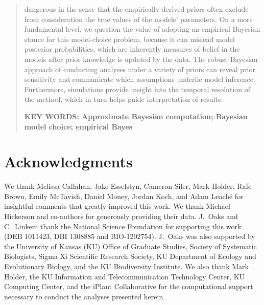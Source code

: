 \documentclass[letterpaper,12pt]{article}
\begin{document}
\begin{abstract}
    dangerous in the sense that the empirically-derived priors often
    exclude from consideration the true values of the models' parameters.
    On a more fundamental level, we question the value of adopting an empirical
    Bayesian stance for this model-choice problem, because it can mislead model
    posterior probabilities, which are inherently measures of belief in the
    models after prior knowledge is updated by the data.
    The robust Bayesian approach of conducting analyses under a variety
    of priors can reveal prior sensitivity and communicate which assumptions
    underlie model inference.
    Furthermore, simulations provide insight into the temporal resolution of
    the method, which in turn helps guide interpretation of results.

    \vspace{12pt}
    \noindent\textbf{KEY WORDS: Approximate Bayesian computation; Bayesian
        model choice; empirical Bayes} 
\end{abstract}

\newpage



\section{Acknowledgments}
We thank Melissa Callahan, Jake Esselstyn, Cameron Siler, Mark Holder, Rafe
Brown, Emily McTavish, Daniel Money, Jordan Koch, and Adam Leach\'{e} for
insightful comments that greatly improved this work.
We thank Michael Hickerson and co-authors for generously providing their data.
J.\ Oaks and C.\ Linkem thank the National Science Foundation for supporting
this work (DEB 1011423, DBI 1308885 and BIO-1202754).
J.\ Oaks was also supported by the University of Kansas (KU) Office of Graduate
Studies, Society of Systematic Biologists, Sigma Xi Scientific Research
Society, KU Department of Ecology and Evolutionary Biology, and the KU
Biodiversity Institute.
We also thank Mark Holder, the KU Information and Telecommunication Technology
Center, KU Computing Center, and the iPlant Collaborative for the computational
support necessary to conduct the analyses presented herein.




\newpage
\singlespacing

\renewcommand\listfigurename{Figure Captions}
\renewcommand\cftdotsep{\cftnodots}
\setlength\cftbeforefigskip{10pt}
\listoffigures
\end{document}
